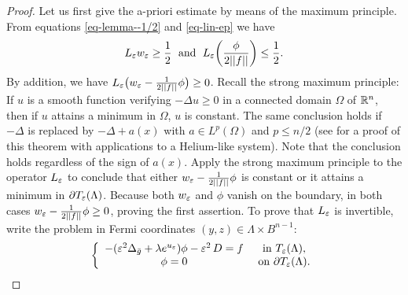 \begin{proof} Let us first give the a-priori estimate by means of the maximum
    principle. From equations \ref{eq-lemma--1/2} and \ref{eq-lin-ep} we have
    \begin{equation}
        L_\varepsilon w_\varepsilon \geq \frac{1}{2}\;\mbox{ and }\;
        L_\varepsilon\bigg(\frac{\phi}{2||f||}\bigg)\leq \frac{1}{2}.
    \end{equation}
    By addition, we have $L_\varepsilon\big(w_\varepsilon-\frac{1}{2||f||}\phi\big)\geq 0$.
    Recall the strong maximum principle: If $u$ is a smooth function verifying
    $-\Delta u\geq 0$ in a connected domain $\Omega$ of $\mathbb{R}^n$, then if $u$
    attains a minimum in $\Omega$, $u$ is constant. The same conclusion holds
    if $-\Delta$ is replaced by $-\Delta+a(x)$ with $a\in L^p(\Omega)$ and
    $p\leq n/2$ (see \cite{1980JPhA...13..417H} for a proof of this theorem with
    applications to a Helium-like system). Note that the conclusion holds
    regardless of the sign of $a(x)$. Apply the strong maximum principle to the
    operator $L_\varepsilon$ to conclude that either $w_\varepsilon-\frac{1}{2||f||}\phi$ is
    constant or it attains a minimum in $\partial T_\varepsilon(\Lambda)$. Because both
    $w_\varepsilon$ and $\phi$ vanish on the boundary, in both cases
    $w_\varepsilon-\frac{1}{2||f||}\phi\geq 0$, proving the first assertion.
    To prove that $L_\varepsilon$ is invertible, write the
    problem in Fermi coordinates $(y,z)\in\Lambda\times B^{n-1}$:
    \begin{equation}
        \left\{
            \begin{array}{cc}
                -(\varepsilon^2 \Delta_{\bar g}+\lambda e^{u_\varepsilon})\phi - \varepsilon^2\, D=f & \mbox{ in }T_\varepsilon(\Lambda),\\
                \phi=0 & \mbox{ on }\partial T_\varepsilon(\Lambda).
            \end{array}
            \right.
    \end{equation}


\end{proof}
